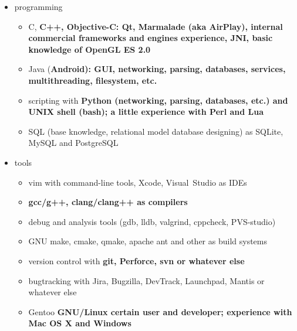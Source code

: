 \begin{itemize}

\item programming

    \begin{itemize}
    \item C, \bfseries C++\mdseries, Objective-C:
    Qt, Marmalade (aka AirPlay), internal commercial frameworks and engines experience,
    \bfseries JNI\mdseries, basic knowledge of OpenGL ES 2.0


    \item Java (\bfseries Android\mdseries):
    GUI, networking, parsing, databases, services, multithreading, filesystem, etc.


    \item scripting with
    \bfseries Python \mdseries (networking, parsing, databases, etc.)
    and
    \bfseries UNIX shell (bash)\mdseries;
    a little experience with
    \bfseries Perl \mdseries and \bfseries Lua\mdseries

    \item SQL (base knowledge, relational model database designing)
as SQLite, MySQL and PostgreSQL
    \end{itemize}

\item tools

    \begin{itemize}
    \item vim with command-line tools, Xcode, Visual~Studio as IDEs
    \item \bfseries gcc/g++\mdseries, clang/clang++ as compilers
    \item debug and analysis tools (gdb, lldb, valgrind, cppcheck, PVS-studio)
    \item GNU make, cmake, qmake, apache ant and other as build systems
    \item version control with \bfseries git\mdseries, Perforce, svn or whatever else
    \item bugtracking with Jira, Bugzilla, DevTrack, Launchpad, Mantis or whatever else
    \item Gentoo \bfseries GNU/Linux \mdseries certain user and developer;
    experience with \bfseries Mac OS X \mdseries and Windows
    \end{itemize}

\end{itemize}

